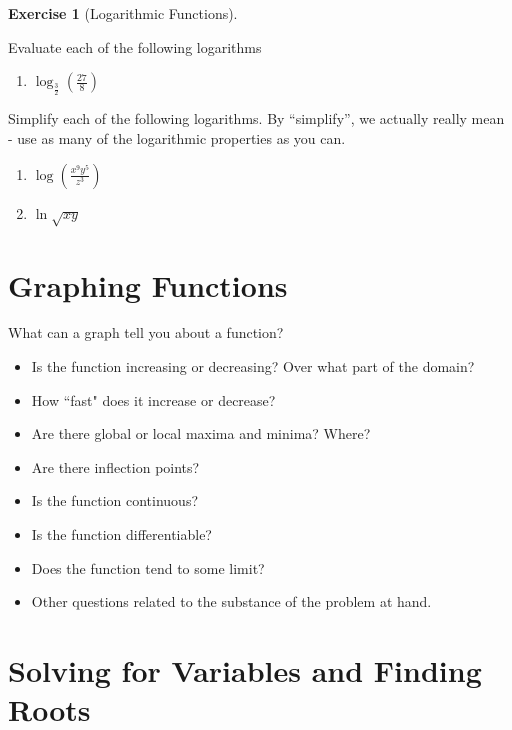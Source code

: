 \documentclass[]{book}
\providecommand{\tightlist}{%
  \setlength{\itemsep}{0pt}\setlength{\parskip}{0pt}}
\theoremstyle{definition}
\theoremstyle{definition}
\theoremstyle{definition}
\newtheorem{exercise}{Exercise}[chapter]
\theoremstyle{remark}
\begin{document}
\begin{exercise}[Logarithmic Functions]
\protect\hypertarget{exr:log1}{}{\label{exr:log1} {} }

Evaluate each of the following logarithms

\begin{enumerate}
\def\labelenumi{\arabic{enumi}.}
\tightlist
\item
  \(\log_\frac{3}{2}(\frac{27}{8})\)
\end{enumerate}

Simplify each of the following logarithms. By ``simplify'', we actually really mean - use as many of the logarithmic properties as you can.

\begin{enumerate}
\def\labelenumi{\arabic{enumi}.}
\setcounter{enumi}{1}
\item
  \(\log(\frac{x^9y^5}{z^3})\)
\item
  \(\ln{\sqrt{xy}}\)
\end{enumerate}
\end{exercise}

\hypertarget{graphing-functions}{%
\section{Graphing Functions}\label{graphing-functions}}

What can a graph tell you about a function?

\begin{itemize}
\tightlist
\item
  Is the function increasing or decreasing? Over what part of the domain?
\item
  How ``fast" does it increase or decrease?
\item
  Are there global or local maxima and minima? Where?
\item
  Are there inflection points?
\item
  Is the function continuous?
\item
  Is the function differentiable?
\item
  Does the function tend to some limit?
\item
  Other questions related to the substance of the problem at hand.
\end{itemize}

\hypertarget{solving-for-variables-and-finding-roots}{%
\section{Solving for Variables and Finding Roots}\label{solving-for-variables-and-finding-roots}}
\end{document}
